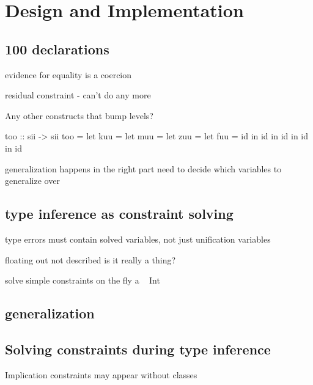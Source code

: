 \chapter{Design and Implementation}
\label{chap:DesignImplementation}




\section{100 declarations}

evidence for equality is a coercion


residual constraint - can't do any more

Any other constructs that bump levels?

too :: sii -> sii
too = let kuu = let muu = let zuu = let fuu = id in id in id in id in id

generalization happens in the right part
need to decide which variables to generalize over

\section{type inference as constraint solving}

type errors must contain solved variables, not just unification variables


floating out not described
is it really a thing?

solve simple constraints on the fly
a ~ Int

\section{generalization}


\section{Solving constraints during type inference}

Implication constraints may appear without classes


